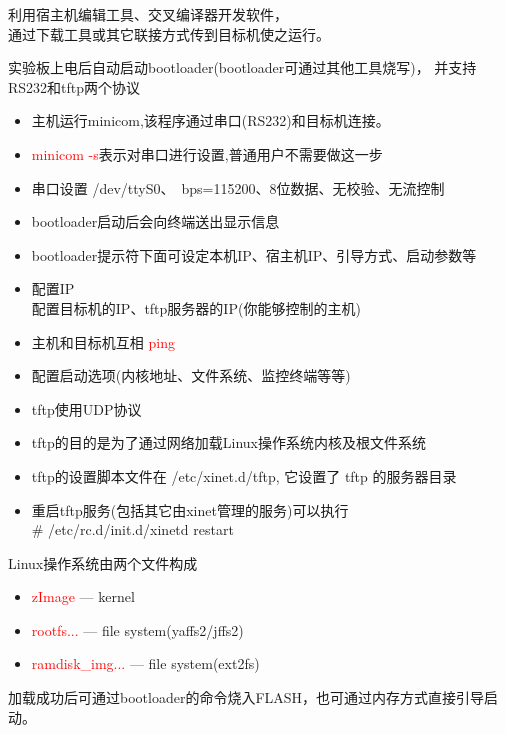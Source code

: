 利用宿主机编辑工具、交叉编译器开发软件，\\
通过下载工具或其它联接方式传到目标机使之运行。
\endslide

实验板上电后自动启动bootloader(bootloader可通过其他工具烧写)，
并支持RS232和tftp两个协议
\begin{itemize}
  \item 主机运行minicom,该程序通过串口(RS232)和目标机连接。
  \item \textcolor{red}{minicom -s}表示对串口进行设置,普通用户不需要做这一步
  \item 串口设置 /dev/ttyS0、~bps=115200、8位数据、无校验、无流控制
  \item bootloader启动后会向终端送出显示信息
  \item bootloader提示符下面可设定本机IP、宿主机IP、引导方式、启动参数等
\end{itemize}
\endslide

\begin{itemize}
  \item 配置IP\\
        配置目标机的IP、tftp服务器的IP(你能够控制的主机)
  \item 主机和目标机互相 \textcolor{red}{ping}
  \item 配置启动选项(内核地址、文件系统、监控终端等等)
\end{itemize}
\endslide

\begin{itemize}
  \item tftp使用UDP协议
  \item tftp的目的是为了通过网络加载Linux操作系统内核及根文件系统
  \item tftp的设置脚本文件在 /etc/xinet.d/tftp, 它设置了 tftp 的服务器目录
  \item 重启tftp服务(包括其它由xinet管理的服务)可以执行\\
        \# /etc/rc.d/init.d/xinetd restart
\end{itemize}
\endslide

Linux操作系统由两个文件构成
\begin{itemize}
  \item \textcolor{red}{zImage} --- kernel
  \item \textcolor{red}{rootfs...}  --- file system(yaffs2/jffs2)
  \item \textcolor{red}{ramdisk\_img...}  --- file system(ext2fs)
\end{itemize}
加载成功后可通过bootloader的命令烧入FLASH，也可通过内存方式直接引导启动。
\endslide

